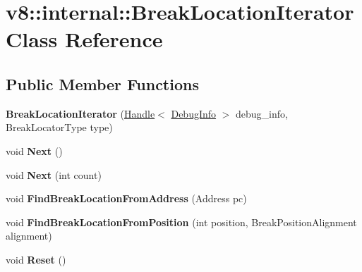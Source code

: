 \hypertarget{classv8_1_1internal_1_1_break_location_iterator}{}\section{v8\+:\+:internal\+:\+:Break\+Location\+Iterator Class Reference}
\label{classv8_1_1internal_1_1_break_location_iterator}
\subsection*{Public Member Functions}
\begin{DoxyCompactItemize}
\item 
\hypertarget{classv8_1_1internal_1_1_break_location_iterator_a53764c5a0ba5c8cf531778d4bfbca323}{}{\bfseries Break\+Location\+Iterator} (\hyperlink{classv8_1_1internal_1_1_handle}{Handle}$<$ \hyperlink{classv8_1_1internal_1_1_debug_info}{Debug\+Info} $>$ debug\+\_\+info, Break\+Locator\+Type type)\label{classv8_1_1internal_1_1_break_location_iterator_a53764c5a0ba5c8cf531778d4bfbca323}

\item 
\hypertarget{classv8_1_1internal_1_1_break_location_iterator_a3ea16caeb590310fbd665d7aaaf9a8ad}{}void {\bfseries Next} ()\label{classv8_1_1internal_1_1_break_location_iterator_a3ea16caeb590310fbd665d7aaaf9a8ad}

\item 
\hypertarget{classv8_1_1internal_1_1_break_location_iterator_a37f805534b06b3969c50baf1188c3612}{}void {\bfseries Next} (int count)\label{classv8_1_1internal_1_1_break_location_iterator_a37f805534b06b3969c50baf1188c3612}

\item 
\hypertarget{classv8_1_1internal_1_1_break_location_iterator_a3034f86d4b89b287799ec68458d3fb24}{}void {\bfseries Find\+Break\+Location\+From\+Address} (Address pc)\label{classv8_1_1internal_1_1_break_location_iterator_a3034f86d4b89b287799ec68458d3fb24}

\item 
\hypertarget{classv8_1_1internal_1_1_break_location_iterator_ad97d90cee3442a62711491e92ffdcc39}{}void {\bfseries Find\+Break\+Location\+From\+Position} (int position, Break\+Position\+Alignment alignment)\label{classv8_1_1internal_1_1_break_location_iterator_ad97d90cee3442a62711491e92ffdcc39}

\item 
\hypertarget{classv8_1_1internal_1_1_break_location_iterator_a5b8267b93cbd44e097f4c5d1ec5f520f}{}void {\bfseries Reset} ()\label{classv8_1_1internal_1_1_break_location_iterator_a5b8267b93cbd44e097f4c5d1ec5f520f}


\end{DoxyCompactItemize}
